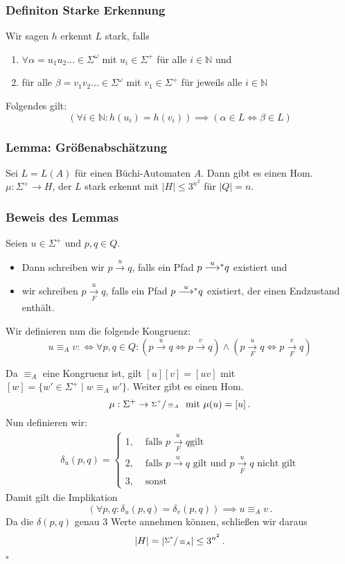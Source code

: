 \documentclass[12pt, german]{article}
\def\ttostar#1{\overset{#1}{\longrightarrow}\negthickspace^*}
\def\tto#1{\overset{#1}{\longrightarrow}}
\def\ttou#1#2{ \overset{#1}{\underset{#2}{\longrightarrow}}}
\newcommand{\N}{\mathbb{N}}
\newcommand{\sigstern}{\Sigma^\ast}
\newcommand{\pom}{^{\omega}}
\newcommand{\splu}{\Sigma^{+}}
\newcommand{\bewiesen}{
	
	\begin{flushright}
		$\square$  \\
\end{flushright}}
\begin{document}
\subsubsection{Definiton Starke Erkennung}
	Wir sagen $h$ erkennt $L$ stark, falls 
	\begin{enumerate}[label=\arabic*)]
	\item $\forall \alpha = u_1u_2\ldots \in \Sigma\pom$ mit $u_i \in \Sigma^+$ für alle $i \in \N$ und
	\item für alle $\beta = v_1v_2 \ldots \in \Sigma\pom$ mit $v_1 \in \Sigma^+$ für jeweils alle $i \in \N$
	\end{enumerate}
	Folgendes gilt: $$(\forall i \in \N: h(u_i) = h(v_i)) \implies (\alpha \in L \iff \beta \in L)$$

\subsubsection{Lemma: Grö\ss enabschätzung}
	Sei $L=L(A)$ für einen Büchi-Automaten $A$. Dann gibt es einen Hom. $\mu : \splu \to H$, der $L$ stark erkennt mit $|H| \leq 3^{n^2}$ für $|Q| = n$.

\subsubsection{Beweis des Lemmas}
	Seien $u \in \Sigma^+$ und $p, q \in Q$.
	 \begin{itemize}
		\item  Dann schreiben wir $p \tto{u} q$, falls ein Pfad $p \ttostar{u} q$ existiert und
		\item wir schreiben $p \ttou{u}{F} q$, falls ein Pfad $p \ttostar{u} q$ existiert, der einen Endzustand enthält.
	\end{itemize}
	Wir definieren nun die folgende Kongruenz: $$u \equiv_A v :\iff \forall p, q \in Q : (p \tto{u} q \iff p \tto{v} q) \land (p\ttou{u}{F} q \iff p \ttou{v}{F} q)$$
	\newline
	
	Da $\equiv_A$ eine Kongruenz ist, gilt $[u][v] = [uv]$ mit $[w] = \{w' \in \Sigma^+ \mid w \equiv_A w'\}$. Weiter gibt es einen Hom. $$\mu: \splu \to \sfrac{\Sigma^+}{\equiv_A}  \text{ mit }\mu(u) = [u]\, .$$
 	Nun definieren wir:
	\begin{align*}
	\delta_u(p,q) = 
		\begin{cases}
		1, &\text{ falls } p \ttou{u}{F} q \text{gilt}\\
		2, &\text{ falls } p \tto{u} q \text{ gilt und } p \ttou{u}{F} q \text{ nicht gilt}\\
		3, &\text{ sonst}
		\end{cases}
	\end{align*}
	Damit gilt die Implikation $$(\forall p, q : \delta_u(p, q) = \delta_v(p, q)) \implies u \equiv_A v\, .$$
	Da die $\delta(p,q)$ genau $3$ Werte annehmen können, schlie\ss en wir daraus $$|H| = |\sfrac{\sigstern}{\equiv_A}| \leq 3^{n^2}\, .$$ 
	\bewiesen
	
\end{document}
